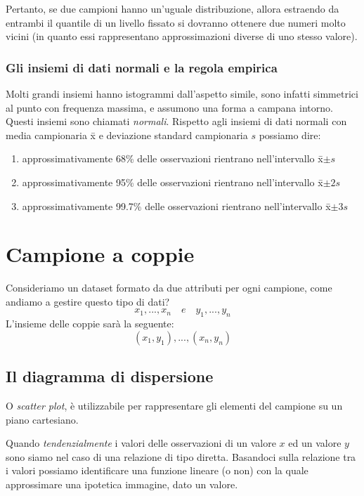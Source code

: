 Pertanto, se due campioni hanno un’uguale distribuzione, allora estraendo da entrambi il quantile di un livello fissato si dovranno ottenere due numeri molto vicini (in quanto essi rappresentano approssimazioni diverse di uno stesso valore).


\subsubsection{Gli insiemi di dati normali e la regola empirica}
Molti grandi insiemi hanno istogrammi dall'aspetto simile, sono infatti simmetrici al punto con frequenza massima, e assumono una forma a campana intorno. Questi insiemi sono chiamati \emph{normali}. Rispetto agli insiemi di dati normali con media campionaria \={x} e deviazione standard campionaria $s$ possiamo dire:
\begin{enumerate}
\item approssimativamente 68\% delle osservazioni rientrano nell'intervallo \={x}$ \pm s$
\item approssimativamente 95\% delle osservazioni rientrano nell'intervallo \={x}$ \pm 2s$
\item approssimativamente 99.7\% delle osservazioni rientrano nell'intervallo \={x}$ \pm 3s$
\end{enumerate}



\section{Campione a coppie}
Consideriamo un dataset formato da due attributi per ogni campione, come andiamo a gestire questo tipo di dati?
\begin{equation*}
		x_1, ..., x_n \quad e  \quad y_1, ..., y_n
	\end{equation*}
	L'insieme delle coppie sarà la seguente:
\begin{equation*}
		{(x_1, y_1), ..., (x_n, y_n)}
	\end{equation*}
\subsection{Il diagramma di dispersione}
O \emph{scatter plot}, è utilizzabile per rappresentare gli elementi del campione su un piano cartesiano. %

Quando \emph{tendenzialmente} i valori delle osservazioni di un valore $x$ ed un valore $y$ sono siamo nel caso di una relazione di tipo diretta. Basandoci sulla relazione tra i valori possiamo identificare una funzione lineare (o non) con la quale approssimare una ipotetica immagine, dato un valore. 

